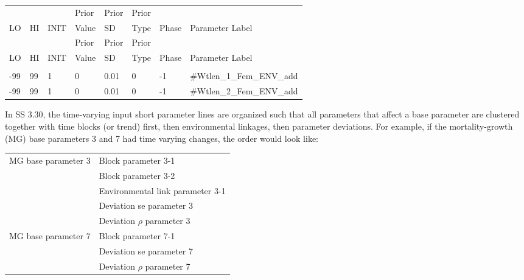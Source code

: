 \begin{longtable}{ p{0.7cm} p{0.7cm} p{0.7cm}  p{1cm}  p{1.4cm}  p{1cm} p{1cm} p{6.7cm}  }
	\hline
	&    &      & Prior &  Prior & Prior & & \Tstrut\\
	LO & HI & INIT & Value &  SD    & Type  & Phase & Parameter Label \Bstrut\\
	\hline
	\endfirsthead
	
	\hline
	&    &      & Prior &  Prior & Prior &  & \Tstrut\\
	LO & HI & INIT & Value &  SD    & Type  & Phase & Parameter Label \Bstrut\\
	\hline
	\endhead
	
	\endfoot
	
	\endlastfoot
	
	\multicolumn{7}{l}{COND: Only if MG parameters are time-varying} \Tstrut\\
	-99   & 99  & 1 & 0 & 0.01 & 0 & -1 &\#Wtlen\_1\_Fem\_ENV\_add\Tstrut\\
	-99   & 99  & 1 & 0 & 0.01 & 0 & -1 &\#Wtlen\_2\_Fem\_ENV\_add\Bstrut\\
	\hline
\end{longtable}

In SS 3.30, the time-varying input short parameter lines are organized such that all parameters that affect a base parameter are clustered together with time blocks (or trend) first, then environmental linkages, then parameter deviations. For example, if the mortality-growth (MG) base parameters 3 and 7 had time varying changes, the order would look like:
 
 \begin{center}
 	\begin{longtable}{p{5cm} p{10cm}}
 		\hline
 		MG base parameter 3 & Block parameter 3-1\Tstrut\\
 		& Block parameter 3-2\\
 		& Environmental link parameter 3-1\\
 		& Deviation se parameter 3 \\
 		& Deviation $\rho$ parameter 3 \Bstrut\\
 		MG base parameter 7 & Block parameter 7-1 \\
 		& Deviation se parameter 7 \\
 		& Deviation $\rho$ parameter 7 \Bstrut\\
 		\hline	 	                    		
 	\end{longtable}
 \end{center}
 
